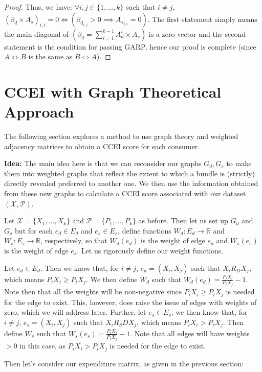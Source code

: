 \documentclass{article} %
\begin{document}
\begin{proof}
Thus, we have: $\forall i, j\in\{1,\ldots,k\}$ such that $i\not=j$, $(\beta_d\times A_s)_{i,i}=0 \iff (\beta_{d_{i,j}}>0 \implies A_{s_{j,i}}=0)$. The first statement simply means the main diagonal of $(\beta_d=\sum_{i=1}^{k-1}A_{d}^{i}\times A_s)$ is a zero vector and the second statement is the condition for passing GARP, hence our proof is complete (since $A\iff B$ is the same as $B\iff A$).
\end{proof}

\section{CCEI with Graph Theoretical Approach}

The following section explores a method to use graph theory and weighted adjacency matrices to obtain a CCEI score for each consumer. 
\bigskip

\textbf{Idea:} The main idea here is that we can reconsider our graphs $G_d, G_s$ to make them into weighted graphs that reflect the extent to which a bundle is (strictly) directly revealed preferred to another one. We then use the information obtained from these new graphs to calculate a CCEI score associated with our dataset $(\mathcal{X},\mathcal{P})$.
\bigskip

Let $\mathcal{X}=\{X_1,\ldots,X_k\}$ and $\mathcal{P}=\{P_1,\ldots,P_k\}$ as before. Then let us set up $G_d$ and $G_s$ but for each $e_d\in E_d$ and $e_s\in E_s$, define functions $W_d:E_d\to\mathbb{R}$ and $W_s:E_s\to\mathbb{R}$, respectively, so that $W_d(e_d)$ is the weight of edge $e_d$ and $W_s(e_s)$ is the weight of edge $e_s$. Let us rigorously define our weight functions.
\bigskip

Let $e_d\in E_d$. Then we know that, for $i\not=j$, $e_d=(X_i, X_j)$ such that $X_i R_D X_j$, which means $P_iX_i\geq P_iX_j$. We then define $W_d$ such that $W_d(e_d)=\frac{P_iX_i}{P_iX_j}-1$. Note then that all the weights will be non-negative since $P_iX_i\geq P_iX_j$ is needed for the edge to exist. This, however, does raise the issue of edges with weights of zero, which we will address later. Further, let $e_s\in E_s$, we then know that, for $i\not=j$, $e_s=(X_i, X_j)$ such that $X_i R_SD X_j$, which means $P_iX_i>P_iX_j$. Then define $W_s$ such that $W_s(e_s)=\frac{P_iX_i}{P_iX_j}-1$. Note that all edges will have weights $>0$ in this case, as $P_iX_i>P_iX_j$ is needed for the edge to exist.
\bigskip

Then let's consider our expenditure matrix, as given in the previous section:
\end{document}
